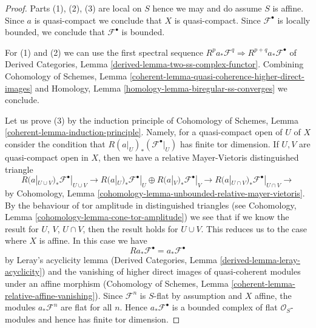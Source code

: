 \documentclass{stacks-project}
\theoremstyle{plain}
\theoremstyle{definition}
\theoremstyle{remark}
\numberwithin{equation}{subsection}
\begin{document}
\begin{proof}
Parts (1), (2), (3) are local on $S$ hence we may and do assume $S$
is affine. Since $a$ is quasi-compact we conclude that $X$ is quasi-compact.
Since $\mathcal{F}^\bullet$ is locally bounded, we conclude that
$\mathcal{F}^\bullet$ is bounded.

\medskip\noindent
For (1) and (2) we can use the first spectral sequence
$R^pa_*\mathcal{F}^q \Rightarrow R^{p + q}a_*\mathcal{F}^\bullet$ of
Derived Categories, Lemma \ref{derived-lemma-two-ss-complex-functor}.
Combining Cohomology of Schemes, Lemma
\ref{coherent-lemma-quasi-coherence-higher-direct-images}
and Homology, Lemma \ref{homology-lemma-biregular-ss-converges}
we conclude.

\medskip\noindent
Let us prove (3) by the induction principle of
Cohomology of Schemes, Lemma \ref{coherent-lemma-induction-principle}.
Namely, for a quasi-compact open of $U$ of $X$ consider the
condition that $R(a|_U)_*(\mathcal{F}^\bullet|_U)$ has
finite tor dimension. If $U, V$ are quasi-compact open in
$X$, then we have a relative Mayer-Vietoris distinguished triangle
$$
R(a|_{U \cup V})_*\mathcal{F}^\bullet|_{U \cup V} \to
R(a|_U)_*\mathcal{F}^\bullet|_U \oplus
R(a|_V)_*\mathcal{F}^\bullet|_V \to
R(a|_{U \cap V})_*\mathcal{F}^\bullet|_{U \cap V} \to
$$
by Cohomology, Lemma \ref{cohomology-lemma-unbounded-relative-mayer-vietoris}.
By the behaviour of tor amplitude in distinguished triangles
(see Cohomology, Lemma \ref{cohomology-lemma-cone-tor-amplitude})
we see that if we know the result for $U$, $V$, $U \cap V$, then
the result holds for $U \cup V$. This reduces us to the case where
$X$ is affine. In this case we have
$$
Ra_*\mathcal{F}^\bullet = a_*\mathcal{F}^\bullet
$$
by Leray's acyclicity lemma
(Derived Categories, Lemma \ref{derived-lemma-leray-acyclicity})
and the vanishing of higher direct images of quasi-coherent modules
under an affine morphism
(Cohomology of Schemes, Lemma \ref{coherent-lemma-relative-affine-vanishing}).
Since $\mathcal{F}^n$ is $S$-flat by assumption and $X$ affine, the modules
$a_*\mathcal{F}^n$ are flat for all $n$. Hence $a_*\mathcal{F}^\bullet$
is a bounded complex of flat $\mathcal{O}_S$-modules and hence has
finite tor dimension.


\end{proof}
\end{document}
